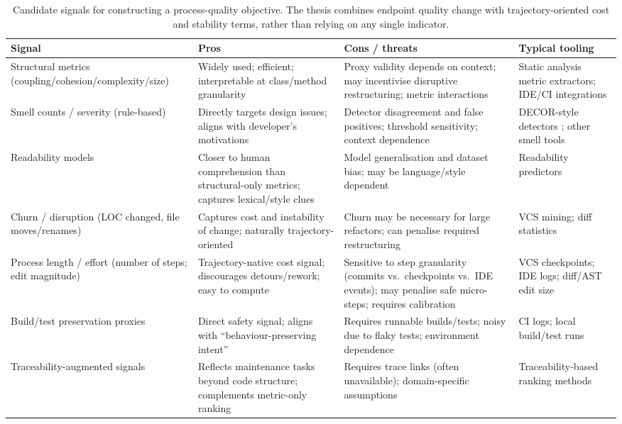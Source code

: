 \begin{table}[htbp]
\centering
\small
\begin{tabular}{L{0.19\textwidth} L{0.26\textwidth} L{0.28\textwidth} L{0.19\textwidth}}
\hline
\textbf{Signal} & \textbf{Pros} & \textbf{Cons / threats} & \textbf{Typical tooling} \\
\hline
Structural metrics (coupling/cohesion/\newline complexity/size) &
Widely used; efficient; interpretable at class/method granularity &
Proxy validity depends on context; may incentivise disruptive restructuring; metric interactions &
Static analysis metric extractors; IDE/CI integrations \\
\hline
Smell counts / severity (rule-based) &
Directly targets design issues; aligns with developer's motivations &
Detector disagreement and false positives; threshold sensitivity; context dependence &
DECOR-style detectors \cite{moha2010decor}; other smell tools \cite{paiva2017evaluation} \\
\hline
Readability models &
Closer to human comprehension than structural-only metrics; captures lexical/style clues &
Model generalisation and dataset bias; may be language/style dependent &
Readability predictors \cite{scalabrino2018readability} \\
\hline
Churn / disruption (LOC changed, file moves/renames) &
Captures cost and instability of change; naturally trajectory-oriented &
Churn may be necessary for large refactors; can penalise required restructuring &
VCS mining; diff statistics \\
\hline
Process length / effort (number of steps; edit magnitude) &
Trajectory-native cost signal; discourages detours/rework; easy to compute &
Sensitive to step granularity (commits vs.\ checkpoints vs.\ IDE events); may penalise safe micro-steps; requires calibration &
VCS checkpoints; IDE logs; diff/AST edit size \\
\hline
Build/test preservation proxies &
Direct safety signal; aligns with ``behaviour-preserving intent'' &
Requires runnable builds/tests; noisy due to flaky tests; environment dependence &
CI logs; local build/test runs \\
\hline
Traceability-augmented signals &
Reflects maintenance tasks beyond code structure; complements metric-only ranking &
Requires trace links (often unavailable); domain-specific assumptions &
Traceability-based ranking methods \cite{wang2018traceability} \\
\hline
\end{tabular}
\caption{Candidate signals for constructing a process-quality objective. The thesis combines endpoint quality change with trajectory-oriented cost and stability terms, rather than relying on any single indicator.}
\label{tab:metric-candidates}
\end{table}


